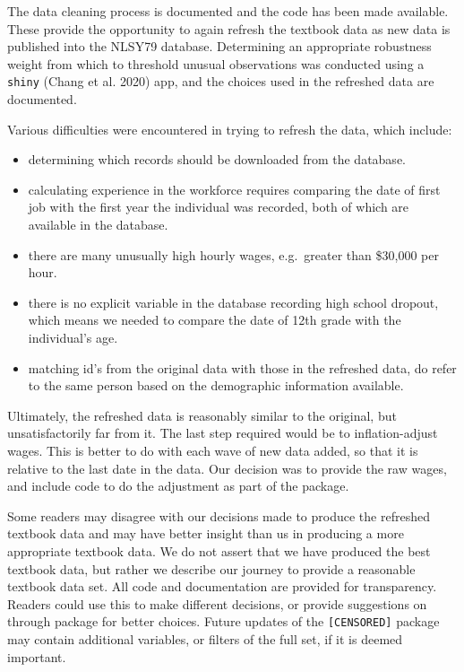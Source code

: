 \documentclass{article}
\begin{document}
The data cleaning process is documented and the code has been made available. These provide the opportunity to again refresh the textbook data as new data is published into the NLSY79 database.
Determining an appropriate robustness weight from which to threshold unusual observations was conducted using a \texttt{shiny} (Chang et al. 2020) app, and the choices used in the refreshed data are documented.

Various difficulties were encountered in trying to refresh the data, which include:

\begin{itemize}
\tightlist
\item
  determining which records should be downloaded from the database.
\item
  calculating experience in the workforce requires comparing the date of first job with the first year the individual was recorded, both of which are available in the database.
\item
  there are many unusually high hourly wages, e.g.~greater than \$30,000 per hour.
\item
  there is no explicit variable in the database recording high school dropout, which means we needed to compare the date of 12th grade with the individual's age.
\item
  matching id's from the original data with those in the refreshed data, do refer to the same person based on the demographic information available.
\end{itemize}

Ultimately, the refreshed data is reasonably similar to the original, but unsatisfactorily far from it. The last step required would be to inflation-adjust wages. This is better to do with each wave of new data added, so that it is relative to the last date in the data. Our decision was to provide the raw wages, and include code to do the adjustment as part of the package.

Some readers may disagree with our decisions made to produce the refreshed textbook data and may have better insight than us in producing a more appropriate textbook data. We do not assert that we have produced the best textbook data, but rather we describe our journey to provide a reasonable textbook data set. All code and documentation are provided for transparency. Readers could use this to make different decisions, or provide suggestions on through package for better choices. Future updates of the \texttt{[CENSORED]} package may contain additional variables, or filters of the full set, if it is deemed important.
\end{document}
